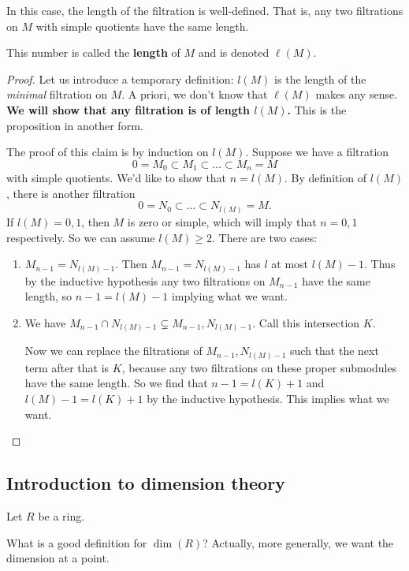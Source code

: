 \begin{proposition} 
In this case, the length of the filtration is well-defined. That is, any two filtrations
on $M$ with simple quotients have the same length.
\end{proposition} 
\begin{definition} 
This number is called the \textbf{length} of $M$ and is denoted $\ell(M)$.
\end{definition} 
\begin{proof} 
Let us introduce a temporary definition: $l(M)$ is the length of the
\emph{minimal} filtration on $M$. A priori, we don't know that $\ell(M)$ makes
any sense. \textbf{We will show that any filtration is of length
$l(M)$.} This is the proposition in another form.

The proof of this claim is by induction on $l(M)$. Suppose we have a filtration
\[ 0 = M_0 \subset M_1 \subset \dots \subset M_n = M  \]
with simple quotients. We'd like to show that $n  = l(M)$. By definition of
$l(M)$, there is another filtration
\[ 0 = N_0 \subset \dots \subset N_{l(M)} = M.  \]
If $l(M) = 0,1$, then $M$ is zero or simple, which will imply that $n=0,1$
respectively. So we can assume $l(M)  \geq 2$.
There are two cases:
\begin{enumerate}
\item $M_{n-1} = N_{l(M) -1 } $. Then $M_{n-1} = N_{l(M)-1}$ has $l$ at most
$l(M)-1$. Thus by the inductive hypothesis any two filtrations on $M_{n-1}$
have the same length, so $n-1 = l(M) -1$ implying what we want. 
\item We have $M_{n-1} \cap N_{l(M) - 1} \subsetneq M_{n-1}, N_{l(M)-1}$. 
Call this intersection $K$. 

Now we can replace the filtrations of $M_{n-1}, N_{l(M)-1}$ such that the next
term after that is $K$, because any two filtrations on these proper submodules
have the same length. So we find that $n-1 = l(K) +1$ and $l(M)-1 = l(K)+1$ by
the inductive hypothesis. This implies what we want.
\end{enumerate}
\end{proof} 


\subsection{Introduction to dimension theory}

Let $R$ be a   ring. 
\begin{question} 
What is a good definition for $\dim(R)$? Actually, more generally, we want the dimension at a
point.
\end{question} 

